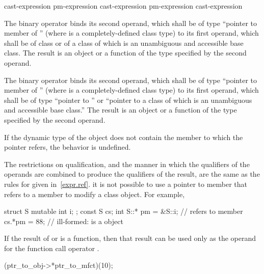 \begin{bnf}
\br
    cast-expression\br
    pm-expression  cast-expression\br
    pm-expression \terminal{->*} cast-expression
\end{bnf}

\pnum
The binary operator  binds its second operand, which shall be
of type ``pointer to member of '' (where  is a
completely-defined class type) to its first operand, which shall be of
class  or of a class of which  is an unambiguous and
accessible base class. The result is an object or a function of the type
specified by the second operand.

\pnum
The binary operator \tcode{->*} binds its second operand, which shall be
of type ``pointer to member of '' (where  is a
completely-defined class type) to its first operand, which shall be of
type ``pointer to '' or ``pointer to a class of which 
is an unambiguous and accessible base class.'' The result is an object
or a function of the type specified by the second operand.

\pnum
If the dynamic type of the object does not contain the member to which
the pointer refers, the behavior is undefined.

\pnum
The restrictions on qualification, and the manner in which
the qualifiers of the operands are combined to produce the
qualifiers of the result, are the same as the rules for
 given in~\ref{expr.ref}.
\enternote 
it is not possible to use a pointer to member that refers to a
 member to modify a  class object. For
example,

\begin{codeblock}
struct S {
	mutable int i;
};
const S cs;
int S::* pm = &S::i;            //  refers to  member 
cs.*pm = 88;                    // ill-formed:  is a  object
\end{codeblock}
\exitnote 

\pnum
{}%
If the result of  or \tcode{->*} is a function, then that
result can be used only as the operand for the function call operator
\tcode{()}.
\enterexample 

\begin{codeblock}
(ptr_to_obj->*ptr_to_mfct)(10);
\end{codeblock}

